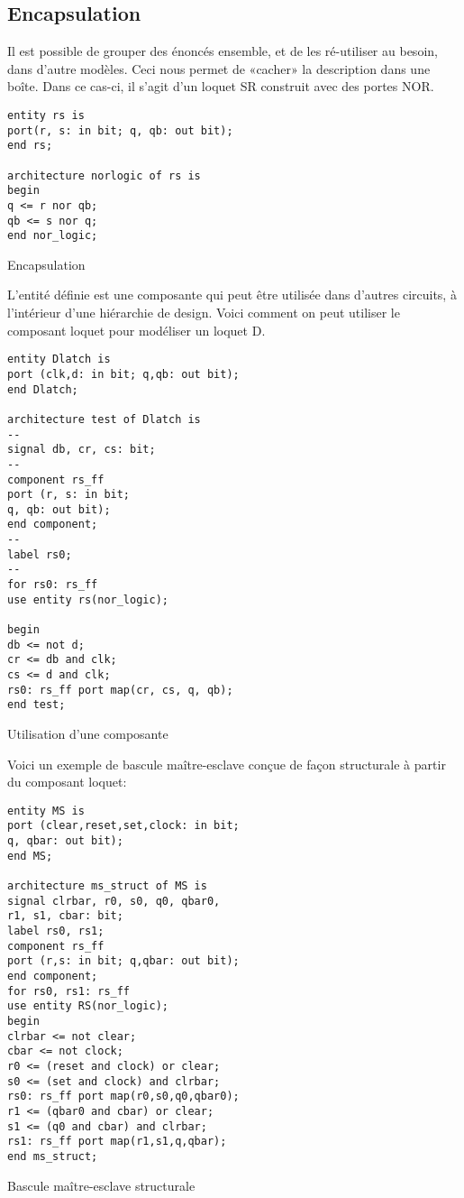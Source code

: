 \documentclass[11pt]{article}
\begin{document}
\subsection{Encapsulation}
\label{sec:org0d6f59b}

Il est possible de grouper des énoncés ensemble, et de les ré-utiliser
au besoin, dans d'autre modèles. Ceci nous permet de «cacher» la
description dans une boîte. Dans ce cas-ci, il s'agit d'un loquet SR
construit avec des portes NOR.

\begin{listing}[htbp]
\begin{verbatim}
entity rs is
port(r, s: in bit; q, qb: out bit);
end rs;

architecture norlogic of rs is
begin
q <= r nor qb;
qb <= s nor q;
end nor_logic;
\end{verbatim}
\caption{Encapsulation}
\end{listing}

L'entité définie est une composante qui peut être utilisée dans
d'autres circuits, à l'intérieur d'une hiérarchie de design. Voici
comment on peut utiliser le composant loquet pour modéliser un loquet D.

\begin{listing}[htbp]
\begin{verbatim}
entity Dlatch is
port (clk,d: in bit; q,qb: out bit);
end Dlatch;

architecture test of Dlatch is
--
signal db, cr, cs: bit;
--
component rs_ff
port (r, s: in bit;
q, qb: out bit);
end component;
--
label rs0;
--
for rs0: rs_ff
use entity rs(nor_logic);

begin
db <= not d;
cr <= db and clk;
cs <= d and clk;
rs0: rs_ff port map(cr, cs, q, qb);
end test;
\end{verbatim}
\caption{Utilisation d'une composante}
\end{listing}

Voici un exemple de bascule maître-esclave conçue de façon structurale
à partir du composant loquet:

\begin{listing}[htbp]
\begin{verbatim}
entity MS is
port (clear,reset,set,clock: in bit;
q, qbar: out bit);
end MS;

architecture ms_struct of MS is
signal clrbar, r0, s0, q0, qbar0,
r1, s1, cbar: bit;
label rs0, rs1;
component rs_ff
port (r,s: in bit; q,qbar: out bit);
end component;
for rs0, rs1: rs_ff
use entity RS(nor_logic);
begin
clrbar <= not clear;
cbar <= not clock;
r0 <= (reset and clock) or clear;
s0 <= (set and clock) and clrbar;
rs0: rs_ff port map(r0,s0,q0,qbar0);
r1 <= (qbar0 and cbar) or clear;
s1 <= (q0 and cbar) and clrbar;
rs1: rs_ff port map(r1,s1,q,qbar);
end ms_struct;
\end{verbatim}
\caption{Bascule maître-esclave structurale}
\end{listing}
\end{document}
